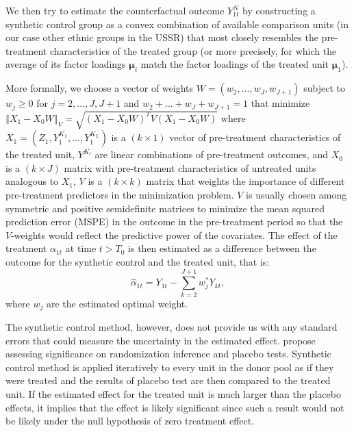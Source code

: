 We then try to estimate the counterfactual outcome $Y_{1t}^N$  by constructing a synthetic control group  as a convex combination of available comparison units (in our case other ethnic groups in the USSR) that most closely resembles the pre-treatment characteristics of the treated group
 (or more precisely, for which the average of its factor loadings $\boldsymbol{\mu}_i$ match the factor loadings of the treated unit  $\boldsymbol{\mu}_1$). 
 
 
 More formally, we choose a vector of weights $W = (w_2, \dots, w_J, w_{J+1})$ subject to $w_j \geq 0$ for $j = 2, \dots, J, J + 1$ and $w_2 +  \dots + w_J + w_{J+1} = 1$ that minimize $\left\Vert X_1 - X_0 W \right\Vert_V = \sqrt{\left(X_1 - X_0 W\right)^T V \left(X_1 - X_0 W\right)}$ where
  $X_1 = (Z_1, Y_1^{K_1}, \dots, Y_1^{K_L})$ is a $(k \times 1)$ vector of pre-treatment characteristics of the treated unit,  $Y^{K_l}$ are linear combinations of
pre-treatment outcomes, and %
  $X_0$ is a $(k \times J)$ matrix with pre-treatment characteristics of untreated units analogous to $X_1$, 
  $V$ is  a $(k \times k)$  matrix that weights the importance of different pre-treatment predictors in the minimization problem. 
  $V$ is usually chosen among symmetric and positive semidefinite matrices to minimize the  mean squared prediction error (MSPE) in the outcome in the pre-treatment period so that the $V$-weights would reflect the predictive power of the covariates. 
The effect of the treatment $\alpha_{1t}$ at time $t > T_0$ is then estimated as a difference between the outcome for the synthetic control and the treated unit, that is:
\begin{equation}
  \hat\alpha_{1t}  = Y_{1t} - \sum_{k = 2}^{J + 1} w_j^* Y_{kt},
\end{equation}
where $w_j$ are the estimated optimal weight. 

The synthetic control method, however, does not provide us with any standard errors that could measure the uncertainty in the estimated effect.
\citet{abadie_synthetic_2010} propose assessing significance  on randomization inference and placebo tests. Synthetic control method is applied iteratively to every unit in the donor pool as if they were treated and the results of placebo test are then compared to the treated unit. If the estimated effect for the treated unit is much larger than the placebo effects, it implies that the effect is likely significant since 
such a result would not be likely under the null hypothesis of zero treatment effect.

